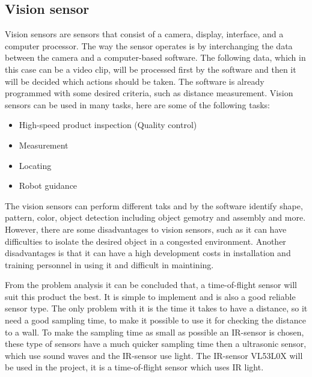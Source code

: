 \subsection*{Vision sensor}\label{ss:camera_pa}
Vision sensors are sensors that consist of a camera, display, interface, and a computer processor. The way the sensor operates is by interchanging the data between the camera and a computer-based software. The following data, which in this case can be a video clip, will be processed first by the software and then it will be decided which actions should be taken. The software is already programmed with some desired criteria, such as distance measurement.
\newline
Vision sensors can be used in many tasks, here are some of the following tasks: 
\begin{itemize}
    \item High-speed product inspection (Quality control)
    \item Measurement
    \item Locating 
    \item Robot guidance 
\end{itemize}
The vision sensors can perform different taks and by the software identify shape, pattern, color, object detection including object gemotry and assembly and more.
However, there are some disadvantages to vision sensors, such as it can have difficulties to isolate the desired object in a congested environment. Another disadvantages is that it can have a high development costs in installation and training personnel in using it and difficult in maintining. 

From the problem analysis it can be concluded that, a time-of-flight sensor will suit this product the best. It is simple to implement and is also a good reliable sensor type. The only problem with it is the time it takes to have a distance, so it need a good sampling time, to make it possible to use it for checking the distance to a wall.
\newline
To make the sampling time as small as possible an IR-sensor is chosen, these type of sensors have a much quicker sampling time then a ultrasonic sensor, which use sound waves and the IR-sensor use light.
\newline
The IR-sensor VL53L0X will be used in the project, it is a time-of-flight sensor which uses IR light. 
\newline
\newline






